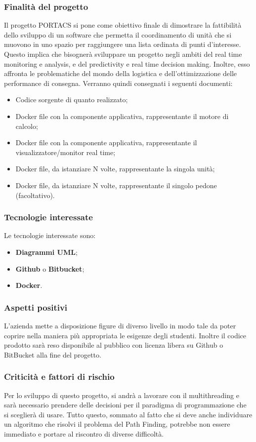 \subsubsection{Finalità del progetto}
Il progetto PORTACS si pone come obiettivo finale di dimostrare la fattibilità dello sviluppo di un software che permetta il coordinamento di unità che si muovono in uno spazio per raggiungere una lista ordinata di punti d'interesse. Questo implica che bisognerà sviluppare un progetto negli ambiti del real time monitoring e analysis, e del predictivity e real time decision making. Inoltre, esso affronta le problematiche del mondo della logistica e dell'ottimizzazione delle performance di consegna.
Verranno quindi consegnati i seguenti documenti:
\begin{itemize}
	\item Codice sorgente di quanto realizzato;
	\item Docker file con la componente applicativa, rappresentante il motore di calcolo;
	\item Docker file con la componente applicativa, rappresentante il visualizzatore/monitor real time;
	\item Docker file, da istanziare N volte, rappresentante la singola unità;
	\item Docker file, da istanziare N volte, rappresentante il singolo pedone (facoltativo).
\end{itemize}
\subsubsection{Tecnologie interessate}
Le tecnologie interessate sono:
\begin{itemize}
	\item \textbf{Diagrammi UML};
	\item \textbf{Github} o \textbf{Bitbucket};	
	\item \textbf{Docker}.
\end{itemize}
\subsubsection{Aspetti positivi}
L'azienda mette a disposizione figure di diverso livello in modo tale da poter coprire nella maniera più appropriata le esigenze degli studenti.
Inoltre il codice prodotto sarà reso disponibile al pubblico con licenza libera su Github o BitBucket alla fine del progetto.
\subsubsection{Criticità e fattori di rischio}
Per lo sviluppo di questo progetto, si andrà a lavorare con il multithreading e sarà necessario prendere delle decisioni per il paradigma di programmazione che si sceglierà di usare. 
Tutto questo, sommato al fatto che si deve anche individuare un algoritmo che risolvi il problema del Path Finding, potrebbe non essere immediato e portare al riscontro di diverse difficoltà.
